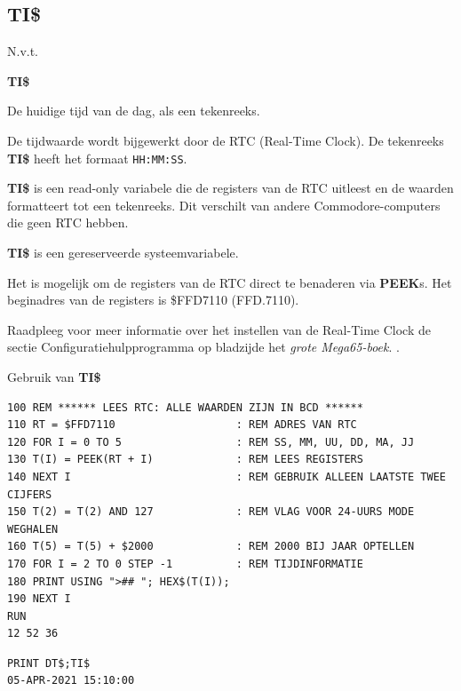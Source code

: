 \subsection{TI\$}
\begin{description}[leftmargin=2cm,style=nextline]
\item [Token:]    N.v.t.

\item [Formaat:]   {\bf TI\$}

\item [Gebruik:]    De huidige tijd van de dag, als een tekenreeks.

                  De tijdwaarde wordt bijgewerkt door de RTC (Real-Time Clock). De tekenreeks {\bf TI\$} heeft het formaat \texttt{HH:MM:SS}.

                  {\bf TI\$} is een read-only variabele die de registers van de RTC uitleest en de waarden formatteert tot een tekenreeks. Dit verschilt van andere Commodore-computers die geen RTC hebben.

\item [Opmerkingen:]  {\bf TI\$} is een gereserveerde systeemvariabele.

                  Het is mogelijk om de registers van de RTC direct te benaderen via {\bf PEEK}s. Het beginadres van de registers is \$FFD7110 (FFD.7110).

Raadpleeg voor meer informatie over het instellen van de Real-Time Clock de sectie Configuratiehulpprogramma op bladzijde \ifdefined\printmanual                     het {\em grote Mega65-boek}.
                  \else
                     .
                  \fi

\item [Voorbeelden:] Gebruik van {\bf TI\$}

\begin{tcolorbox}[colback=black,coltext=white]
\verbatimfont{\codefont}
\begin{verbatim}
100 REM ****** LEES RTC: ALLE WAARDEN ZIJN IN BCD ******
110 RT = $FFD7110                   : REM ADRES VAN RTC
120 FOR I = 0 TO 5                  : REM SS, MM, UU, DD, MA, JJ
130 T(I) = PEEK(RT + I)             : REM LEES REGISTERS
140 NEXT I                          : REM GEBRUIK ALLEEN LAATSTE TWEE CIJFERS
150 T(2) = T(2) AND 127             : REM VLAG VOOR 24-UURS MODE WEGHALEN
160 T(5) = T(5) + $2000             : REM 2000 BIJ JAAR OPTELLEN
170 FOR I = 2 TO 0 STEP -1          : REM TIJDINFORMATIE
180 PRINT USING ">## "; HEX$(T(I));
190 NEXT I
RUN
12 52 36
\end{verbatim}
\end{tcolorbox}

\begin{tcolorbox}[colback=black,coltext=white]
\verbatimfont{\codefont}
\begin{verbatim}
PRINT DT$;TI$
05-APR-2021 15:10:00
\end{verbatim}
\end{tcolorbox}
\end{description}

